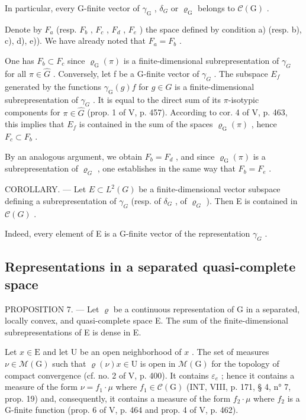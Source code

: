 In particular, every G-finite vector of \(\gamma_{\mathrm{G}}\) , \(\delta_{G}\) or \(\varrho_{\mathrm{G}}\) belongs to \(\mathcal{C}(\mathrm{G})\) .

Denote by \(F_{a}\) (resp. \(F_{b}\) , \(F_{c}\) , \(F_{d}\) , \(F_{e}\) ) the space defined by condition a) (resp. b), c), d), e)). We have already noted that \(F_{a} = F_{b}\) .

One has \(F_{b} \subset F_{c}\) since \(\varrho_{\mathrm{G}}(\pi)\) is a finite-dimensional subrepresentation of \(\gamma_{G}\) for all \(\pi \in \widehat{G}\) . Conversely, let f be a G-finite vector of \(\gamma_{G}\) . The subspace \(E_{f}\) generated by the functions \(\gamma_{\mathrm{G}}(g)f\) for \(g \in G\) is a finite-dimensional subrepresentation of \(\gamma_{G}\) . It is equal to the direct sum of its \(\pi\)-isotypic components for \(\pi \in \widehat{G}\) (prop. 1 of V, p. 457). According to cor. 4 of V, p. 463, this implies that \(E_{f}\) is contained in the sum of the spaces \(\varrho_{\mathrm{G}}(\pi)\) , hence \(F_{c} \subset F_{b}\) .

By an analogous argument, we obtain \(F_{b} = F_{d}\) , and since \(\varrho_{\mathrm{G}}(\pi)\) is a subrepresentation of \(\varrho_{G}\) , one establishes in the same way that \(F_{b} = F_{e}\) .

COROLLARY. --- Let \(E \subset L^{2}(G)\) be a finite-dimensional vector subspace defining a subrepresentation of \(\gamma_{G}\) (resp. of \(\delta_{G}\) , of \(\varrho_{G}\) ). Then E is contained in \(\mathcal{C}(G)\) .

Indeed, every element of E is a G-finite vector of the representation \(\gamma_{G}\) .

\subsection{Representations in a separated quasi-complete space}

PROPOSITION 7. --- Let \(\varrho\) be a continuous representation of G in a separated, locally convex, and quasi-complete space E. The sum of the finite-dimensional subrepresentations of E is dense in E.

Let \(x \in \mathrm{E}\) and let U be an open neighborhood of \(x\) . The set of measures \(\nu \in \mathcal{M}(\mathrm{G})\) such that \(\varrho(\nu)x \in \mathrm{U}\) is open in \(\mathcal{M}(\mathrm{G})\) for the topology of compact convergence (cf. no. 2 of V, p. 400). It contains \(\varepsilon_e\) ; hence it contains a measure of the form \(\nu = f_1 \cdot \mu\) where \(f_1 \in \mathcal{C}(\mathrm{G})\) (INT, VIII, p. 171, § 4, n° 7, prop. 19) and, consequently, it contains a measure of the form \(f_2 \cdot \mu\) where \(f_2\) is a G-finite function (prop. 6 of V, p. 464 and prop. 4 of V, p. 462).

